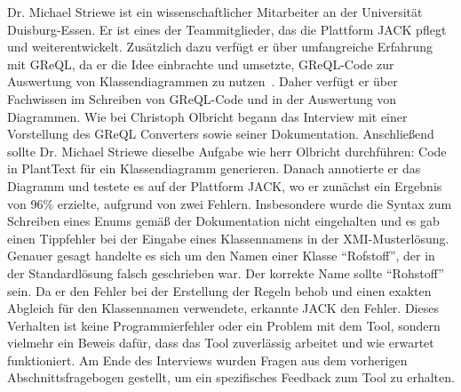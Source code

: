 Dr. Michael Striewe ist ein wissenschaftlicher Mitarbeiter an der Universität Duisburg-Essen. Er ist eines der
Teammitglieder, das die Plattform JACK pflegt und weiterentwickelt. Zusätzlich dazu verfügt er über umfangreiche
Erfahrung mit GReQL, da er die Idee einbrachte und umsetzte, GReQL-Code zur Auswertung von Klassendiagrammen zu
nutzen~\cite{striewe2011automated}. Daher verfügt er über Fachwissen im Schreiben von GReQL-Code und in der Auswertung
von Diagrammen. Wie bei Christoph Olbricht begann das Interview mit einer Vorstellung des GReQL Converters sowie seiner
Dokumentation. Anschließend sollte Dr. Michael Striewe dieselbe Aufgabe wie herr Olbricht durchführen: Code in PlantText
für ein Klassendiagramm generieren. Danach annotierte er das Diagramm und testete es auf der Plattform JACK, wo er
zunächst ein Ergebnis von 96\% erzielte, aufgrund von zwei Fehlern. Insbesondere wurde die Syntax zum Schreiben eines
Enums gemäß der Dokumentation nicht eingehalten und es gab einen Tippfehler bei der Eingabe eines Klassennamens in der
XMI-Musterlösung. Genauer gesagt handelte es sich um den Namen einer Klasse ``Rofstoff'', der in der Standardlösung
falsch geschrieben war. Der korrekte Name sollte ``Rohstoff'' sein. Da er den Fehler bei der Erstellung der Regeln behob
und einen exakten Abgleich für den Klassennamen verwendete, erkannte JACK den Fehler. Dieses Verhalten ist keine
Programmierfehler oder ein Problem mit dem Tool, sondern vielmehr ein Beweis dafür, dass das Tool zuverlässig arbeitet
und wie erwartet funktioniert. Am Ende des Interviews wurden Fragen aus dem vorherigen Abschnittsfragebogen gestellt,
um ein spezifisches Feedback zum Tool zu erhalten.

